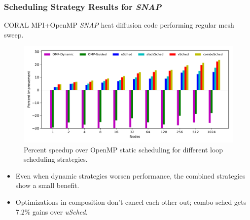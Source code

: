 {\begin{frame}[label=combinedregmesh]
\frametitle{Scheduling Strategy Results for \textit{SNAP}}
{\tiny CORAL MPI+OpenMP \textit{SNAP} heat diffusion code performing regular mesh sweep.}
\begin{figure}[ht!]
\includegraphics[scale=0.38]{./plots/app-scaling-strat-SNAP-fastNUMA2}
\caption{\tiny Percent speedup over OpenMP static scheduling for
  different loop scheduling strategies.}
\end{figure}
\begin{itemize}
  \small \item \small Even when dynamic strategies worsen performance, the combined strategies show a small benefit.
\item \small Optimizations in composition don't cancel each other out; combo sched gets 7.2\% gains over \textit{uSched}.
\end{itemize}
\end{frame}

}

